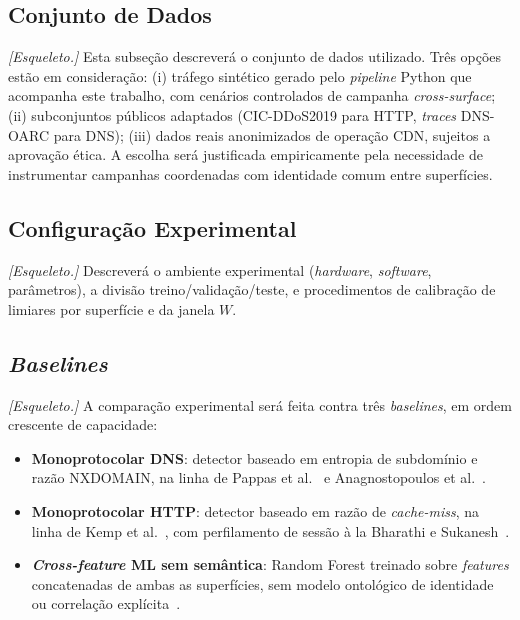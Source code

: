 \documentclass[preprint,12pt]{elsarticle}
\begin{document}
\subsection{Conjunto de Dados}

\textit{[Esqueleto.]} Esta subseção descreverá o conjunto de dados utilizado. Três opções estão em consideração: (i) tráfego sintético gerado pelo \emph{pipeline} Python que acompanha este trabalho, com cenários controlados de campanha \emph{cross-surface}; (ii) subconjuntos públicos adaptados (CIC-DDoS2019 para HTTP, \emph{traces} DNS-OARC para DNS); (iii) dados reais anonimizados de operação CDN, sujeitos a aprovação ética. A escolha será justificada empiricamente pela necessidade de instrumentar campanhas coordenadas com identidade comum entre superfícies.

\subsection{Configuração Experimental}

\textit{[Esqueleto.]} Descreverá o ambiente experimental (\emph{hardware}, \emph{software}, parâmetros), a divisão treino/validação/teste, e procedimentos de calibração de limiares por superfície e da janela $W$.

\subsection{\emph{Baselines}}

\textit{[Esqueleto.]} A comparação experimental será feita contra três \emph{baselines}, em ordem crescente de capacidade:

\begin{itemize}
    \item \textbf{Monoprotocolar DNS}: detector baseado em entropia de subdomínio e razão NXDOMAIN, na linha de Pappas et al.~\cite{pappas2009dns} e Anagnostopoulos et al.~\cite{anagnostopoulos2013dns}.
    \item \textbf{Monoprotocolar HTTP}: detector baseado em razão de \emph{cache-miss}, na linha de Kemp et al.~\cite{kemp2023approach}, com perfilamento de sessão à la Bharathi e Sukanesh~\cite{bharathi2012pca}.
    \item \textbf{\emph{Cross-feature} ML sem semântica}: Random Forest treinado sobre \emph{features} concatenadas de ambas as superfícies, sem modelo ontológico de identidade ou correlação explícita~\cite{fernandes2015autonomous}.
\end{itemize}
\end{document}
